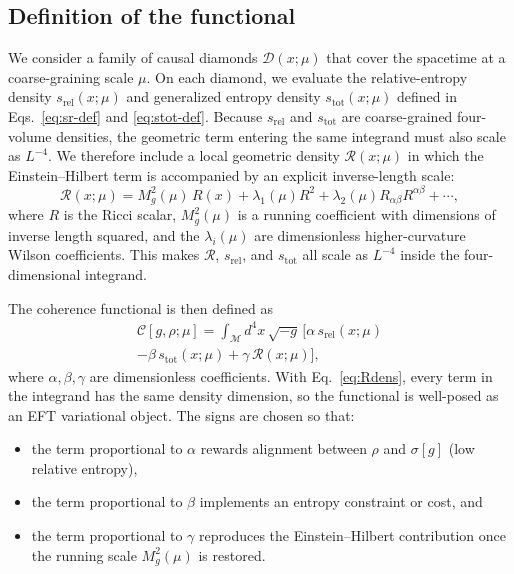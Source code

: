 \documentclass[aps,prd,twocolumn,superscriptaddress,nofootinbib,floatfix]{revtex4-2}
\newcommand{\Cfunc}{\mathcal{C}}
\newcommand{\Ddom}{\mathcal{D}}
\newcommand{\Rdens}{\mathcal{R}}
\newcommand{\sr}{s_{\mathrm{rel}}}
\newcommand{\stot}{s_{\mathrm{tot}}}
\begin{document}
\subsection{Definition of the functional}

We consider a family of causal diamonds $\Ddom(x;\mu)$ that cover the spacetime at a coarse-graining scale $\mu$.
On each diamond, we evaluate the relative-entropy density $\sr(x;\mu)$ and generalized entropy density $\stot(x;\mu)$ defined in Eqs.~\eqref{eq:sr-def} and \eqref{eq:stot-def}.
Because $\sr$ and $\stot$ are coarse-grained four-volume densities, the geometric term entering the same integrand must also scale as $L^{-4}$. We therefore include a local geometric density $\Rdens(x;\mu)$ in which the Einstein--Hilbert term is accompanied by an explicit inverse-length scale:
\begin{equation}
    \Rdens(x;\mu)
    =
    M_g^2(\mu)\,R(x)
    + \lambda_1(\mu) R^2
    + \lambda_2(\mu) R_{\alpha\beta}R^{\alpha\beta}
    + \cdots,
    \label{eq:Rdens}
\end{equation}
where $R$ is the Ricci scalar, $M_g^2(\mu)$ is a running coefficient with dimensions of inverse length squared, and the $\lambda_i(\mu)$ are dimensionless higher-curvature Wilson coefficients. This makes $\Rdens$, $\sr$, and $\stot$ all scale as $L^{-4}$ inside the four-dimensional integrand.

The coherence functional is then defined as
\begin{multline}
    \Cfunc[g,\rho;\mu]
    =
    \int_{\mathcal{M}} d^4x \,\sqrt{-g}\,
    \big[
        \alpha\,\sr(x;\mu) \\
        - \beta\,\stot(x;\mu)
        + \gamma\,\Rdens(x;\mu)
    \big],
    \label{eq:C-def}
\end{multline}
where $\alpha,\beta,\gamma$ are dimensionless coefficients. With Eq.~\eqref{eq:Rdens}, every term in the integrand has the same density dimension, so the functional is well-posed as an EFT variational object.
The signs are chosen so that:
\begin{itemize}
    \item the term proportional to $\alpha$ rewards alignment between $\rho$ and $\sigma[g]$ (low relative entropy),
    \item the term proportional to $\beta$ implements an entropy constraint or cost, and
    \item the term proportional to $\gamma$ reproduces the Einstein--Hilbert contribution once the running scale $M_g^2(\mu)$ is restored.
\end{itemize}
\end{document}
